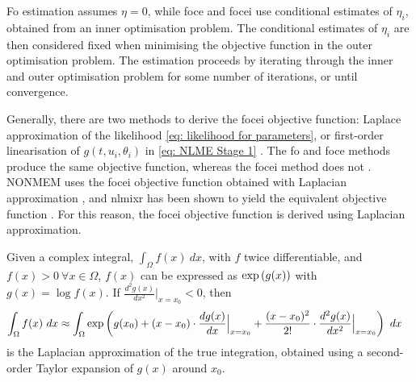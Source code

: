 Fo estimation assumes $\eta=0$, while foce and focei use conditional estimates of $\eta_i$, obtained from an inner optimisation problem. The conditional estimates of $\eta_i$ are then considered fixed when minimising the objective function in the outer optimisation problem. The estimation proceeds by iterating through the inner and outer optimisation problem for some number of iterations, or until convergence.

Generally, there are two methods to derive the focei objective function: Laplace approximation of the likelihood \eqref{eq: likelihood for parameters}, or first-order linearisation of $g(t, u_i, \theta_i)$ in \eqref{eq: NLME Stage 1} \citep[p. 161]{Bae2016}. The fo and foce methods produce the same objective function, whereas the focei method does not \citep[p. 581]{Wang2007}. 
NONMEM uses the focei objective function obtained with Laplacian approximation \citep[p. 585]{Wang2007}, and nlmixr has been shown to yield the equivalent objective function \citep{nlmixr}. For this reason, the focei objective function is derived using Laplacian approximation.

Given a complex integral, $ \int_\Omega f(x) \ dx$, with $f$ twice differentiable, and $f(x)>0 \ \forall x \in \Omega$, $f(x)$ can be expressed as $\text{exp}\left({g(x)}\right)$ with $g(x)=\log f(x)$. If $\frac{d^2 g(x)}{d x^2}\big\rvert_{x=x_0}<0$, then
\begin{align}
    \int_\Omega f(x) \ dx &\approx \int_\Omega \text{exp}\left({g(x_0) +(x-x_0) \cdot\frac{d g(x)}{d x}\Big\rvert_{x=x_0} +\frac{(x-x_0)^2}{2!} \cdot \frac{d^2 g(x)}{d x^2}\Big\rvert_{x=x_0}}\right)\ dx \label{eq: LAPL approx}
\end{align}
is the Laplacian approximation of the true integration, obtained using a second-order Taylor expansion of $g(x)$ around $x_0$. 

